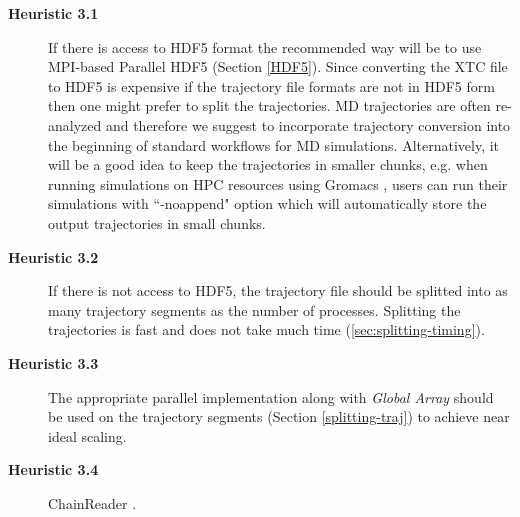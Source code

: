 \begin{description}
\begin{description}
  \item[\textbf{Heuristic 3.1}] If there is access to HDF5 format the recommended way will be to use MPI-based Parallel HDF5 (Section \ref{HDF5}). Since converting the XTC file to HDF5 is expensive if the trajectory file formats are not in HDF5 form then one might prefer to split the trajectories. MD trajectories are often re-analyzed and therefore we suggest to incorporate trajectory conversion into the beginning of standard workflows for MD simulations. 
 Alternatively, it will be a good idea to keep the trajectories in smaller chunks, e.g. when running simulations on HPC resources using Gromacs \cite{Gromacs3, Gromacs1}, users can run their simulations with ``-noappend" option which will automatically store the output trajectories in small chunks.
  \item[\textbf{Heuristic 3.2}] If there is not access to HDF5, the trajectory file should be splitted into as many trajectory segments as the number of processes. Splitting the trajectories is fast and does not take much time (\ref{sec:splitting-timing}).
  \item[\textbf{Heuristic 3.3}] The appropriate parallel implementation along with \emph{Global Array} should be used on the trajectory segments (Section \ref{splitting-traj}) to achieve near ideal scaling.
  \item[\textbf{Heuristic 3.4}] ChainReader .
\end{description}
\end{description}
